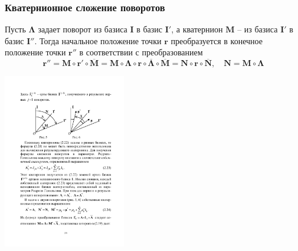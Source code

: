 \documentclass[utf8]{beamer}
\begin{document}
\begin{frame}
\frametitle{Кватернионное сложение поворотов}
Пусть $\mathbf{\Lambda}$ задает поворот из
базиса $\mathbf{I}$ в базис $\mathbf{I}'$, а кватернион $\mathbf{M}$ -- из
базиса $\mathbf{I}'$ в базис $\mathbf{I}''$. Тогда начальное положение точки
$\mathbf{r}$ преобразуется в конечное положение точки $\mathbf{r}''$ в соответствии с
преобразованием
$$
\mathbf{r}'' = \mathbf{M}\circ\mathbf{r}'\circ\overline{\mathbf{M}} =
\mathbf{M}\circ\mathbf{\Lambda}\circ\mathbf{r}\circ\overline{\mathbf{\Lambda}}\circ\overline{\mathbf{M}}
= \mathbf{N}\circ\mathbf{r}\circ\overline{\mathbf{N}}, \quad \mathbf{N} =
\mathbf{M}\circ\mathbf{\Lambda}
$$
\begin{center}
\includegraphics[width=0.4\textwidth]{pic/multiple_rotations.pdf}
\end{center}
\end{frame}
\end{document}
